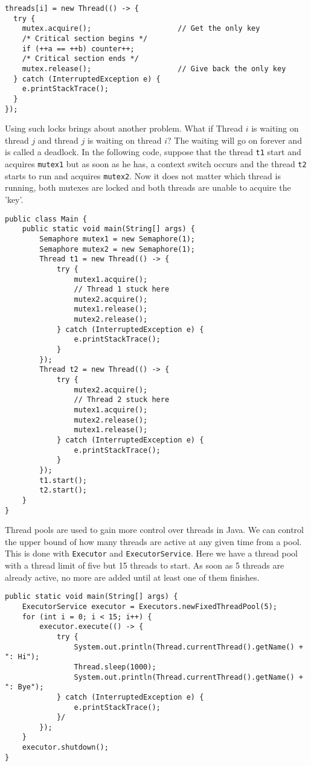 \begin{lstlisting}[style=A_Java]
threads[i] = new Thread(() -> {
  try {
    mutex.acquire();                    // Get the only key
    /* Critical section begins */
    if (++a == ++b) counter++;
    /* Critical section ends */
    mutex.release();                    // Give back the only key
  } catch (InterruptedException e) {
    e.printStackTrace();
  }
});
\end{lstlisting}
Using such locks brings about another problem. What if Thread $i$ is waiting on thread $j$ and thread $j$ is waiting on thread $i$? The waiting will go on forever and is called a deadlock. In the following code, suppose that the thread \texttt{t1} start and acquires \texttt{mutex1} but as soon as he has, a context switch occurs and the thread \texttt{t2} starts to run and acquires \texttt{mutex2}. Now it does not matter which thread is running, both mutexes are locked and both threads are unable to acquire the 'key'.
\begin{lstlisting}[style=A_Java]
public class Main {
    public static void main(String[] args) {
        Semaphore mutex1 = new Semaphore(1);
        Semaphore mutex2 = new Semaphore(1);
        Thread t1 = new Thread(() -> {
            try {
                mutex1.acquire();
                // Thread 1 stuck here
                mutex2.acquire();
                mutex1.release();
                mutex2.release();
            } catch (InterruptedException e) {
                e.printStackTrace();
            }
        });
        Thread t2 = new Thread(() -> {
            try {
                mutex2.acquire();
                // Thread 2 stuck here
                mutex1.acquire();
                mutex2.release();
                mutex1.release();
            } catch (InterruptedException e) {
                e.printStackTrace();
            }
        });
        t1.start();
        t2.start();
    }
}
\end{lstlisting}
Thread pools are used to gain more control over threads in Java. We can control the upper bound of how many threads are active at any given time from a pool. This is done with \texttt{Executor} and \texttt{ExecutorService}. Here we have a thread pool with a thread limit of five but 15 threads to start. As soon as 5 threads are already active, no more are added until at least one of them finishes.
\begin{lstlisting}[style=A_Java]
public static void main(String[] args) {
    ExecutorService executor = Executors.newFixedThreadPool(5);
    for (int i = 0; i < 15; i++) {
        executor.execute(() -> {
            try {
                System.out.println(Thread.currentThread().getName() + ": Hi");
                Thread.sleep(1000);
                System.out.println(Thread.currentThread().getName() + ": Bye");
            } catch (InterruptedException e) {
                e.printStackTrace();
            }/
        });
    }
    executor.shutdown();
}
\end{lstlisting}

